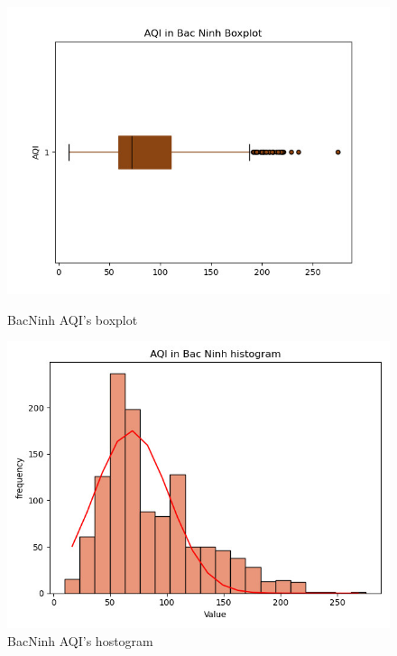 \documentclass[conference]{IEEEtran}
\begin{document}
\begin{figure}[H]
    \centering
    \begin{minipage}{0.23\textwidth}
        \centering
        \includegraphics[width=1\textwidth]{bibliography/figure/Analysis-Dataset/bn_box.png}
        \caption{BacNinh AQI's boxplot}
        \label{fig:1}
    \end{minipage}
    \hfill
    \begin{minipage}{0.23\textwidth}
        \centering
        \includegraphics[width=1\textwidth]{bibliography/figure/Analysis-Dataset/bn_his.png}
        \caption{BacNinh AQI's hostogram}
        \label{fig:2}
    \end{minipage}
\end{figure}
\end{document}
